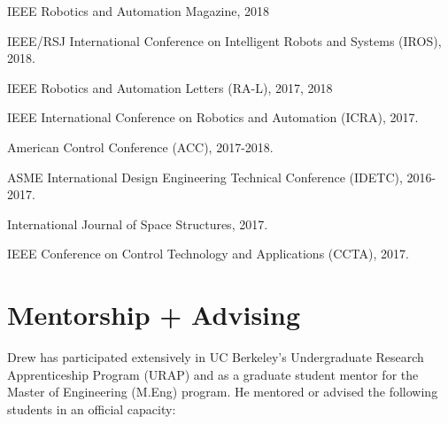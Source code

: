 \documentclass[letterpaper]{deedy-resume} %
\begin{document}
\begin{tightitemize}

\item IEEE Robotics and Automation Magazine, 2018

\item IEEE/RSJ International Conference on Intelligent Robots and Systems (IROS), 2018.

\item IEEE Robotics and Automation Letters (RA-L), 2017, 2018
  
\item IEEE International Conference on Robotics and Automation (ICRA), 2017.

\item American Control Conference (ACC), 2017-2018.

\item ASME International Design Engineering Technical Conference (IDETC), 2016-2017.

\item International Journal of Space Structures, 2017.

\item IEEE Conference on Control Technology and Applications (CCTA), 2017.

\end{tightitemize}






\section{Mentorship + Advising}

\vspace{0.2cm}

Drew has participated extensively in UC Berkeley's Undergraduate Research Apprenticeship Program (URAP) and as a graduate student mentor for the Master of Engineering (M.Eng) program.
He mentored or advised the following students in an official capacity:

\end{document}
